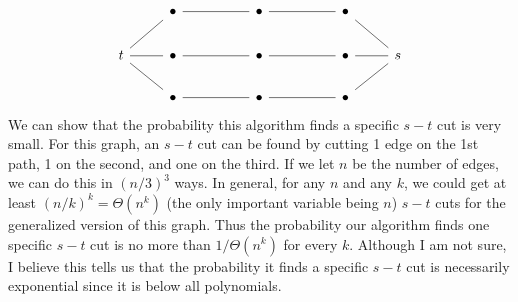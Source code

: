 \documentclass[12pt]{article}
\theoremstyle{definition}
\theoremstyle{remark}
\begin{document}
\begin{enumerate}[leftmargin=\labelsep]
		\[\begin{tikzcd}
			& \bullet && \bullet && \bullet \\
			t & \bullet && \bullet && \bullet & s \\
			& \bullet && \bullet && \bullet
			\arrow[no head, from=2-1, to=3-2]
			\arrow[no head, from=3-2, to=3-4]
			\arrow[no head, from=3-4, to=3-6]
			\arrow[no head, from=3-6, to=2-7]
			\arrow[no head, from=2-6, to=2-7]
			\arrow[no head, from=2-4, to=2-6]
			\arrow[no head, from=2-2, to=2-4]
			\arrow[no head, from=2-1, to=2-2]
			\arrow[no head, from=2-1, to=1-2]
			\arrow[no head, from=1-2, to=1-4]
			\arrow[no head, from=1-4, to=1-6]
			\arrow[no head, from=1-6, to=2-7]
		\end{tikzcd}\]
		We can show that the probability this algorithm finds a specific $s-t$ cut is very small. For this graph, an $s-t$ cut can be found by cutting 1 edge on the 1st path, 1 on the second, and one on the third. If we let $n$ be the number of edges, we can do this in $(n/3)^3$ ways. In general, for any $n$ and any $k$, we could get at least $(n/k)^k = \Theta(n^k)$ (the only important variable being $n$) $s-t$ cuts for the generalized version of this graph. Thus the probability our algorithm finds one specific $s-t$ cut is no more than $1/\Theta(n^k)$ for every $k$. Although I am not sure, I believe this tells us that the probability it finds a specific $s-t$ cut is necessarily exponential since it is below all polynomials.
	\end{enumerate}
\end{document}
